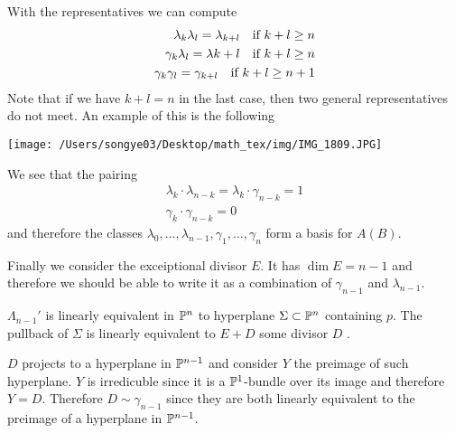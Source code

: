 \documentclass[12pt]{article}
\begin{document}
\begin{example}
    \hfill

    With the representatives we can compute \begin{align*}
        \lambda_k\lambda_l = \lambda_{k+l} \texty {if $k+l\geq n$} \\
        \gamma_k\lambda_l = \lambda{k+l} \texty {if $k+l\geq n$} \\
        \gamma_k\gamma_l = \gamma_{k+l} \texty {if $k+l\geq n+1$}
    \end{align*} Note that if we have $k+l = n$ in the last case, then two general representatives
    do not meet. An example of this is the following \begin{center}
        \texttt{[image: /Users/songye03/Desktop/math\_tex/img/IMG\_1809.JPG]}
    \end{center}
    We see that the pairing \begin{align*}
        \lambda_k \cdot \lambda_{n-k} = \lambda_k \cdot \gamma_{n-k} = 1 \\
        \gamma_k \cdot \gamma_{n-k} = 0
    \end{align*} and therefore the classes $\lambda_0,\dots, \lambda_{n-1},\gamma_1,\dots,\gamma_n$ form a basis for $A(B)$.

    \hfill

    Finally we consider the exceiptional divisor $E$. It has $\dim E = n-1$ and therefore
    we should be able to write it as a combination of $\gamma_{n-1}$ and $\lambda_{n-1}$. 

    \hfill

    $\Lambda_{n-1}'$ is linearly equivalent in $\P^n$ to hyperplane $\Sigma \subset \P^n$
    containing $p$. The pullback of $\Sigma$ is linearly equivalent to $E + D$ some divisor $D$ 
    .

    \hfill

    $D$ projects to a hyperplane in $\P^{n-1}$ and consider $Y$ the preimage of such hyperplane. $Y$ 
    is irredicuble since it is a $\P^1$-bundle over its image and therefore $Y=D$. Therefore $D \sim \gamma_{n-1}$ 
    since they are both linearly equivalent to the preimage of a hyperplane in $\P^{n-1}$.

    \hfill


\end{example}
\end{document}
